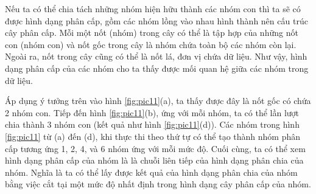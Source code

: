 Nếu ta có thể chia tách những nhóm hiện hữu thành các nhóm con thì ta sẽ có được hình dạng phân cấp, gồm các nhóm lồng vào nhau hình thành nên cấu trúc cây phân cấp.
Mỗi một nốt (nhóm) trong cây có thể là tập hợp của những nốt con (nhóm con) và nốt gốc trong cây là nhóm chứa toàn bộ các nhóm còn lại.
Ngoài ra, nốt trong cây cũng có thể là nốt lá, đơn vị chứa dữ liệu.
Như vậy, hình dạng phân cấp của các nhóm cho ta thấy được mối quan hệ giữa các nhóm trong dữ liệu.

Áp dụng ý tưởng trên vào hình \ref{fig:pic11}(a), ta thấy được đây là nốt gốc có chứa 2 nhóm con.
Tiếp đến hình \ref{fig:pic11}(b), ứng với mỗi nhóm, ta có thể lần lượt chia thành 3 nhóm con (kết quả như hình \ref{fig:pic11}(d)).
Các nhóm trong hình \ref{fig:pic11} từ (a) đến (d), khi thực thi theo thứ tự có thể tạo thành nhóm phân cấp tương ứng 1, 2, 4, và 6 nhóm ứng với mỗi mức độ.
Cuối cùng, ta có thể xem hình dạng phân cấp của nhóm là là chuỗi liên tiếp của hình dạng phân chia của nhóm.
Nghĩa là ta có thể lấy được kết quả của hình dạng phân chia của nhóm bằng việc cắt tại một mức độ nhất định trong hình dạng cây phân cấp của nhóm.


